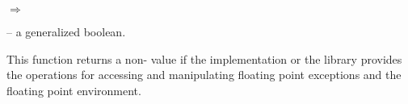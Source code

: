 \documentclass[../Environment-Queries.tex]{subfiles}
\begin{document}

\DSyntax{}

 
$\Rightarrow$ 

\DArgsNValues{}

 -- a generalized boolean.

\DDescription{}

This function returns a non- value if the \CL{}
implementation or the \CL{} library provides the operations for
accessing and manipulating floating point exceptions
 and the floating
point environment.
\end{document}
